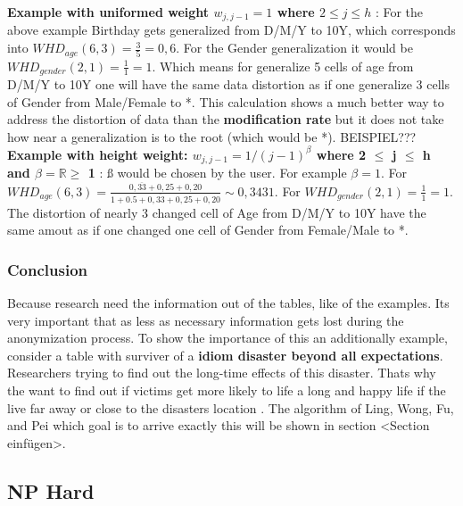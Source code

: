 \documentclass{llncs}
\newcommand{\R}{\mathbb{R}}
\begin{document}
\textbf{Example with uniformed weight $w_{j,j-1} = 1$ where $2\leq j \leq h$} \cite{li2006achieving}: For the above example Birthday gets generalized from D/M/Y to 10Y, which corresponds into $WHD_{age}(6,3) = \frac{3}{5} = 0,6$. For the Gender generalization it would be $WHD_{gender}(2,1) = \frac{1}{1} = 1$. Which means for generalize 5 cells of age from D/M/Y to 10Y one will have the same data distortion as if one generalize 3 cells of Gender from Male/Female to *. This calculation shows a much better way to address the distortion of data than the \textbf{modification rate} but it does not take how near a generalization is to the root (which would be *). BEISPIEL??? \\

\textbf{Example with height weight: $w_{j,j-1} = 1 / (j-1)^{\beta}$ where 2 $\leq$ j $\leq$ h and $\beta = \R \geq$ 1} \cite{li2006achieving}:
ß would be chosen by the user. For example $\beta = 1$. For $WHD_{age}(6,3) = \frac{0,\overline{33}+0,25+0,20}{1+0.5+0,\overline{33}+0,25+0,20} \sim 0,3431$. For $WHD_{gender}(2,1) = \frac{1}{1} = 1$. The distortion of nearly 3 changed cell of Age from D/M/Y to  10Y have the same amout as if one changed one cell of Gender from Female/Male to *. 

\subsubsection{Conclusion}

Because research need the information out of the tables, like of the examples. Its very important that as less as necessary information gets lost during the anonymization process. To show the importance  of this an additionally example, consider a table with surviver of a \textbf{idiom disaster beyond all expectations}. Researchers trying to find out the long-time effects of this disaster. Thats why the want to find out if victims get more likely to life a long and happy life if the live far away or close to the disasters location 
.  The algorithm of Ling, Wong, Fu, and Pei which goal is to arrive exactly this will be shown in section <Section einfügen>.


\subsection{NP Hard}
\end{document}
